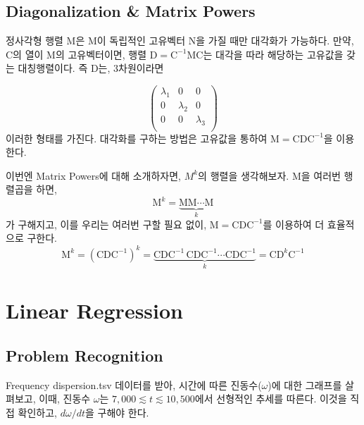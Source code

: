 \documentclass[11pt]{article}
\begin{document}
\subsection{Diagonalization \& Matrix Powers} 
정사각형 행렬 M은 M이 독립적인 고유벡터 N을 가질 때만 대각화가 가능하다. 만약, C의 열이 M의 고유벡터이면, 행렬 $\mathrm D = \mathrm C^{-1}\mathrm{MC}$는 대각을 따라 해당하는 고유값을 갖는 대칭행렬이다. 즉 D는, 3차원이라면

\begin{equation}
\begin{pmatrix}
 \lambda_1&  0&  0\\
 0&  \lambda_2&  0\\
 0&  0&\lambda_3  \\
\end{pmatrix}
\end{equation} 
이러한 형태를 가진다. 대각화를 구하는 방법은 고유값을 통하여 $\mathrm M = \mathrm C\mathrm{DC}^{-1}$을 이용한다.

이번엔 Matrix Powers에 대해 소개하자면, $M^k$의 행렬을 생각해보자. M을 여러번 행렬곱을 하면,
\begin{equation}
\mathrm M^k = \underbrace{\mathrm M\mathrm M\cdots \mathrm M}_{k}
\end{equation} 
가 구해지고, 이를 우리는 여러번 구할 필요 없이, $\mathrm M = \mathrm C\mathrm{DC}^{-1}$를 이용하여 더 효율적으로 구한다.
\begin{equation}
\mathrm M^k = (\mathrm C\mathrm D\mathrm C^{-1})^k
= \underbrace{\mathrm C\mathrm D\mathrm C^{-1}\,\mathrm C\mathrm D\mathrm C^{-1}\cdots\mathrm C\mathrm D\mathrm C^{-1}}_{k}
= \mathrm C\mathrm D^k\mathrm C^{-1}
\end{equation} 
\pagebreak











\section{Linear Regression}
\subsection{Problem Recognition} 
Frequency dispersion.tsv 데이터를 받아, 시간에 따른 진동수($\omega$)에 대한 그래프를 살펴보고, 이때, 진동수 $\omega$는 $7,000 \lesssim t \lesssim 10,500$에서 선형적인 추세를 따른다. 이것을 직접 확인하고, $d\omega/dt$을 구해야 한다.
\end{document}
